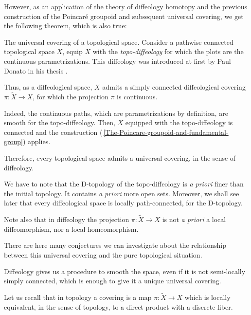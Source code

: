 However,
as an application of the theory of diffeology homotopy and the previous construction of the Poincaré groupoid and subsequent universal covering,
we get the following theorem,
which is also true:

\begin{Article}{The universal covering of a topological space.}{}
  Consider a pathwise connected topological space $X$,
  equip $X$ with the \emph{topo-diffeology} for which the plots are the continuous parametrizations.
  This diffeology was introduced at first by Paul Donato in his thesis \cite{Don84}.

  Thus,
  as a diffeological space,
  $X$ admits a simply connected diffeological covering $\pi \colon \tilde X \to X$,
  for which the projection $\pi$ is continuous.

  Indeed,
  the continuous paths,
  which are parametrizations by definition,
  are smooth for the topo-diffeology.
  Then,
  $X$ equipped with the topo-diffeology is connected and the construction (\textsection\,\ref{The-Poincare-groupoid-and-fundamental-group}) applies.

  Therefore,
  every topological space admits a universal covering,
  in the sense of diffeology.

  We have to note that the D-topology of the topo-diffeology is {\em a priori} finer than the initial topology.
  It contains {\em a priori} more open sets.
  Moreover,
  we shall see later that every diffeological space is locally path-connected,
  for the D-topology.

  Note also that in diffeology the projection $\pi \colon \tilde X \to X$ is not {\em a priori} a local diffeomorphism,
  nor a local homeomorphism.

  There are here many conjectures we can investigate about the relationship between this universal covering and the pure topological situation.

  Diffeology gives us a procedure to smooth the space,
  even if it is not semi-locally simply connected,
  which is enough to give it a unique universal covering.

  Let us recall that in topology a covering is a map $\pi \colon \tilde X \to X$ which is locally equivalent,
  in the sense of topology,
  to a direct product with a discrete fiber.
\end{Article}

